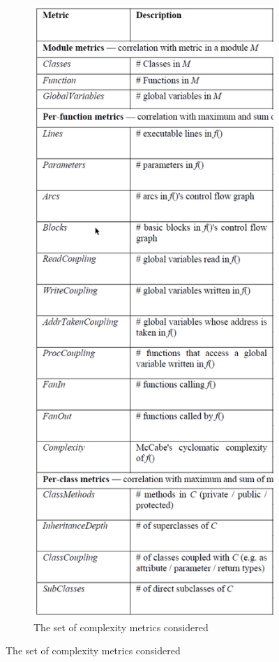 \begin{figure}[H]
\begin{subfigure}{.5\textwidth}
         \includegraphics[scale=0.2]{./src/mining_metrics_metrics.png}
         \caption{The set of complexity metrics considered}\label{mining:metrics}
     \end{subfigure}
 \end{figure}


